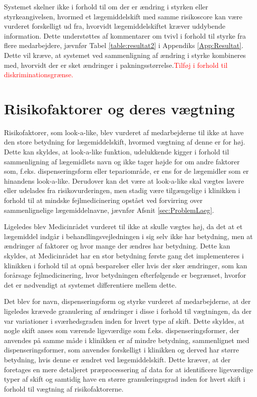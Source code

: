 Systemet skelner ikke i forhold til om der er ændring i styrken eller  styrkeangivelsen, hvormed et lægemiddelskift med samme risikoscore kan være vurderet forskelligt ud fra, hvorvidt lægemiddelskiftet kræver uddybende information. Dette understøttes af kommentarer om tvivl i forhold til styrke fra flere medarbejdere, jævnfør Tabel \ref{table:resultat2} i Appendiks \ref{App:Resultat}. Dette vil kræve, at systemet ved sammenligning af ændring i styrke kombineres med, hvorvidt der er sket ændringer i pakningsstørrelse.\textcolor{red}{Tilføj i forhold til diskriminationsgrænse.}

\section{Risikofaktorer og deres vægtning}
Risikofaktorer, som look-a-like, blev vurderet af medarbejderne til ikke at have den store betydning for lægemiddelskift, hvormed vægtning af denne er for høj. Dette kan skyldes, at look-a-like funktion, udelukkende kigger i forhold til sammenligning af lægemidlets navn og ikke tager højde for om andre faktorer som, f.eks. dispenseringsform eller tepariområde, er ens for de lægemidler som er hinandens look-a-like. Derudover kan det være at look-a-like skal vægtes lavere eller udelades fra risikovurderingen, men stadig være tilgængelige i klinikken i forhold til at mindske fejlmedicinering opstået ved forvirring over sammenlignelige lægemiddelnavne, jævnfør Afsnit \ref{sec:ProblemLaeg}.

Ligeledes blev Medicinrådet vurderet til ikke at skulle vægtes høj, da det at et lægemiddel indgår i behandlingsvejledningen i sig selv ikke har betydning, men at ændringer af faktorer og hvor mange der ændres har betydning. Dette kan skyldes, at Medicinrådet har en stor betydning første gang det implementeres i klinikken i forhold til at opnå besparelser eller hvis der sker ændringer, som kan forårsage fejlmedicinering, hvor betydningen efterfølgende er begrænset, hvorfor det er nødvendigt at systemet differentiere mellem dette.

Det blev for navn, dispenseringsform og styrke vurderet af medarbejderne, at der ligeledes krævede granulering af ændringer i disse i forhold til vægtningen, da der var variationer i sværhedsgraden inden for hvert type af skift. Dette skyldes, at nogle skift anses som værende ligeværdige som f.eks. dispenseringsformer, der anvendes på samme måde i klinikken er af mindre betydning, sammenlignet med dispenseringsformer, som anvendes forskelligt i klinikken og derved har større betydning, hvis denne er ændret ved lægemiddelskift. Dette kræver, at der foretages en mere detaljeret præprocessering af data for at identificere ligeværdige typer af skift og samtidig have en større granuleringsgrad inden for hvert skift i forhold til vægtning af risikofaktorerne.

